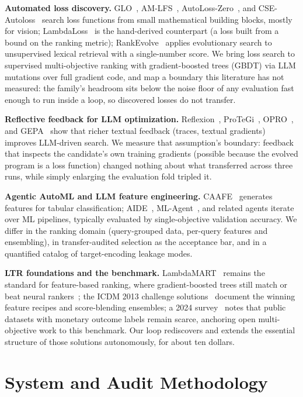 \documentclass[]{ceurart}
\begin{document}
\textbf{Automated loss discovery.} GLO~\cite{glo}, AM-LFS~\cite{amlfs},
AutoLoss-Zero~\cite{autolosszero}, and CSE-Autoloss~\cite{cseautoloss}
search loss functions from small mathematical building blocks, mostly for
vision; LambdaLoss~\cite{lambdaloss} is the hand-derived counterpart (a loss
built from a bound on the ranking metric);
RankEvolve~\cite{rankevolve} applies evolutionary search to unsupervised
lexical retrieval with a single-number score. We bring loss search to supervised multi-objective ranking with
gradient-boosted trees (GBDT) via LLM mutations over full gradient code, and map a boundary this literature has
not measured: the family's headroom sits below the noise floor of any
evaluation fast enough to run inside a loop, so discovered losses do not
transfer.

\textbf{Reflective feedback for LLM optimization.} Reflexion~\cite{reflexion},
ProTeGi~\cite{protegi}, OPRO~\cite{opro}, and GEPA~\cite{gepa} show that richer textual feedback (traces, textual gradients)
improves LLM-driven search. We measure that assumption's boundary: feedback that inspects the
candidate's own training gradients (possible because the evolved program is
a loss function) changed nothing about what transferred across three runs,
while simply enlarging the evaluation fold tripled it.

\textbf{Agentic AutoML and LLM feature engineering.} CAAFE~\cite{caafe}
generates features for tabular classification; AIDE~\cite{aide},
ML-Agent~\cite{mlagent}, and related agents iterate over ML pipelines, typically evaluated by single-objective validation
accuracy. We differ in the ranking domain (query-grouped data, per-query features
and ensembling), in transfer-audited selection as the acceptance bar, and
in a quantified catalog of target-encoding leakage modes.

\textbf{LTR foundations and the benchmark.} LambdaMART~\cite{lambdamart}
remains the standard for feature-based ranking, where gradient-boosted trees
still match or beat neural rankers~\cite{qin2021}; the ICDM 2013 challenge
solutions~\cite{liu2013} document the winning feature recipes and score-blending ensembles; a 2024 survey~\cite{survey2024} notes that public
datasets with monetary outcome labels remain scarce, anchoring open
multi-objective work to this benchmark. Our loop rediscovers and extends the essential structure of those
solutions autonomously, for about ten dollars.

\section{System and Audit Methodology}
\end{document}
